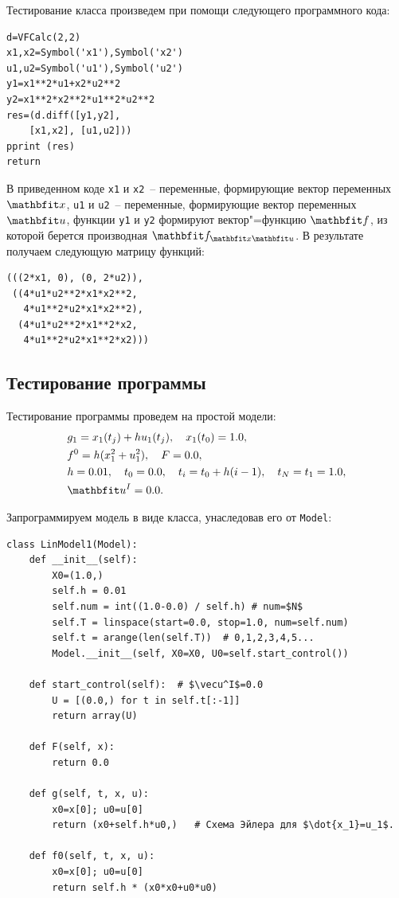 \documentclass[a4paper,14pt, openany, twoside, draft]{extbook} %
\begin{document}
Тестирование класса произведем при помощи следующего программного кода:

\begin{verbatim}
d=VFCalc(2,2)
x1,x2=Symbol('x1'),Symbol('x2')
u1,u2=Symbol('u1'),Symbol('u2')
y1=x1**2*u1+x2*u2**2
y2=x1**2*x2**2*u1**2*u2**2
res=(d.diff([y1,y2],
    [x1,x2], [u1,u2]))
pprint (res)
return
\end{verbatim}

В приведенном коде \texttt{x1} и \texttt{x2}~-- переменные, формирующие вектор переменных $\vecx$, \texttt{u1} и \texttt{u2}~-- переменные, формирующие вектор переменных $\vecu$, функции \texttt{y1} и \texttt{y2} формируют вектор"=функцию $\vecf$, из которой берется производная $\vecf_{\vecx\vecu}$.  В результате получаем следующую матрицу функций:
\begin{verbatim}
(((2*x1, 0), (0, 2*u2)),
 ((4*u1*u2**2*x1*x2**2,
   4*u1**2*u2*x1*x2**2),
  (4*u1*u2**2*x1**2*x2,
   4*u1**2*u2*x1**2*x2)))
\end{verbatim}

\subsection{Тестирование программы}
\label{sec:testing}

Тестирование программы проведем на простой модели:
\begin{align*}
  &g_1=x_1(t_j)+hu_1(t_j),\quad x_1(t_0)=1.0,\\
  &f^0=h(x_1^2+u_1^2),\quad F=0.0, \\
  &h=0.01,\quad t_0=0.0, \quad t_i=t_0+h(i-1),\quad t_N=t_1=1.0,\\
  &\vecu^I=0.0.
\end{align*}

Запрограммируем модель в виде класса, унаследовав его от \texttt{Model}:
\begin{verbatim}
class LinModel1(Model):
    def __init__(self):
        X0=(1.0,)
        self.h = 0.01
        self.num = int((1.0-0.0) / self.h) # num=$N$
        self.T = linspace(start=0.0, stop=1.0, num=self.num)
        self.t = arange(len(self.T))  # 0,1,2,3,4,5...
        Model.__init__(self, X0=X0, U0=self.start_control())

    def start_control(self):  # $\vecu^I$=0.0
        U = [(0.0,) for t in self.t[:-1]]
        return array(U)

    def F(self, x):
        return 0.0

    def g(self, t, x, u):
        x0=x[0]; u0=u[0]
        return (x0+self.h*u0,)   # Схема Эйлера для $\dot{x_1}=u_1$.

    def f0(self, t, x, u):
        x0=x[0]; u0=u[0]
        return self.h * (x0*x0+u0*u0)
\end{verbatim}
\end{document}
